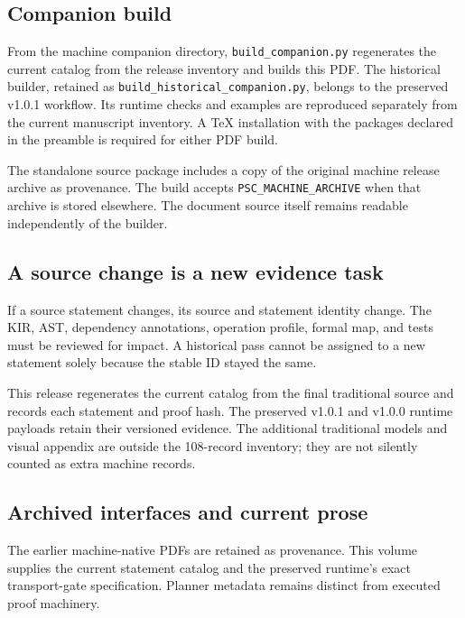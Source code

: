 \documentclass[a4paper,11pt]{article}
\begin{document}
\subsection{Companion build}
From the machine companion directory, \nolinkurl{build_companion.py} regenerates the current catalog from the release inventory and builds this PDF. The historical builder, retained as \nolinkurl{build_historical_companion.py}, belongs to the preserved v1.0.1 workflow. Its runtime checks and examples are reproduced separately from the current manuscript inventory. A TeX installation with the packages declared in the preamble is required for either PDF build.

The standalone source package includes a copy of the original machine release archive as provenance. The build accepts \nolinkurl{PSC_MACHINE_ARCHIVE} when that archive is stored elsewhere. The document source itself remains readable independently of the builder.
\subsection{A source change is a new evidence task}
If a source statement changes, its source and statement identity change. The KIR, AST, dependency annotations, operation profile, formal map, and tests must be reviewed for impact. A historical pass cannot be assigned to a new statement solely because the stable ID stayed the same.

This release regenerates the current catalog from the final traditional source and records each statement and proof hash. The preserved v1.0.1 and v1.0.0 runtime payloads retain their versioned evidence. The additional traditional models and visual appendix are outside the 108-record inventory; they are not silently counted as extra machine records.
\subsection{Archived interfaces and current prose}
The earlier machine-native PDFs are retained as provenance. This volume supplies the current statement catalog and the preserved runtime's exact transport-gate specification. Planner metadata remains distinct from executed proof machinery.
\end{document}
